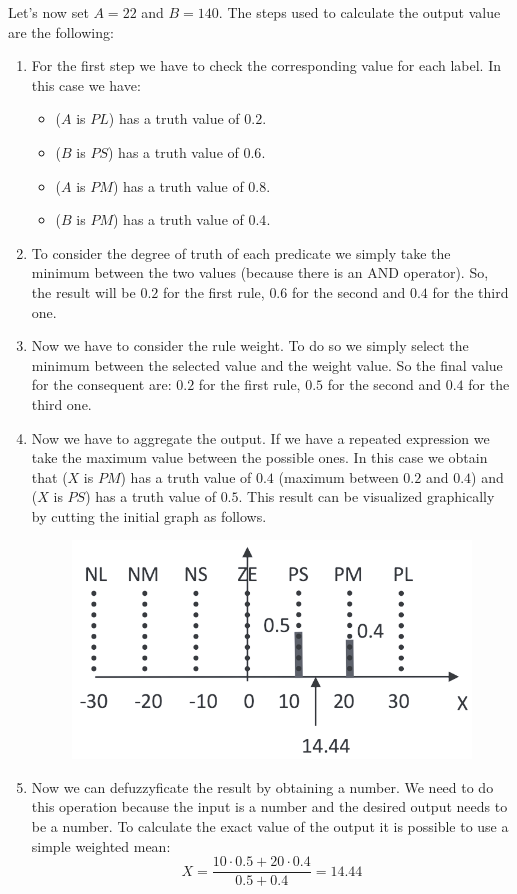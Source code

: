 \documentclass[12pt, a4paper]{report}
\begin{document}
\begin{example}
        Let's now set $A=22$ and $B=140$. The steps used to calculate the output value are the following:
        \begin{enumerate}
            \item For the first step we have to check the corresponding value for each label. In this case we have:
                \begin{itemize}
                    \item ($A$ is $PL$) has a truth value of $0.2$.
                    \item ($B$ is $PS$) has a truth value of $0.6$.
                    \item ($A$ is $PM$) has a truth value of $0.8$.
                    \item ($B$ is $PM$) has a truth value of $0.4$.
                \end{itemize}
            \item To consider the degree of truth of each predicate we simply take the minimum between the two values (because there is an AND 
                operator). So, the result will be $0.2$ for the first rule, $0.6$ for the second and $0.4$ for the third one.
            \item Now we have to consider the rule weight. To do so we simply select the minimum between the selected value and the weight value.
                So the final value for the consequent are: $0.2$ for the first rule, $0.5$ for the second and $0.4$ for the third one. 
            \item  Now we have to aggregate the output. If we have a repeated expression we take the maximum value between the possible ones. 
                In this case we obtain that ($X$ is $PM$) has a truth value of $0.4$ (maximum between $0.2$ and $0.4$) and ($X$ is $PS$) has a 
                truth value of $0.5$. This result can be visualized graphically by cutting the initial graph as follows.
                \begin{figure}[H]
                    \centering
                    \includegraphics[width=0.5\linewidth]{images/cut.png}
                \end{figure}
            \item Now we can defuzzyficate the result by obtaining a number. We need to do this operation because the input is a number and the 
            desired output needs to be a number. To calculate the exact value of the output it is possible to use a simple weighted mean: 
            \[X=\frac{10 \cdot 0.5 + 20 \cdot 0.4}{0.5+0.4}=14.44\]
        \end{enumerate}
    \end{example}
\end{document}
